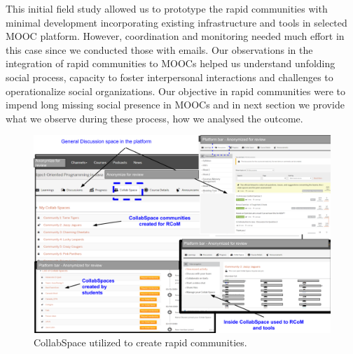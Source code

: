 \documentclass[manuscript,screen,review]{acmart}
\begin{document}
This initial field study allowed us to prototype the rapid communities with minimal development incorporating existing infrastructure and tools in selected MOOC platform. However, coordination and monitoring needed much effort in this case since we conducted those with emails. Our observations in the integration of rapid communities to MOOCs helped us understand unfolding social process,  capacity to foster interpersonal interactions and challenges to operationalize social organizations. Our objective in rapid communities were to impend long missing social presence in MOOCs and in next section we provide what we observe during these process, how we analysed the outcome. 



\begin{figure}[h]
  \centering
  \includegraphics[width=\linewidth]{images/CollabSpacedetails.png}
  \caption{CollabSpace utilized to create rapid communities.}
 \label{fig:CollabSpace}
\end{figure}
\end{document}
